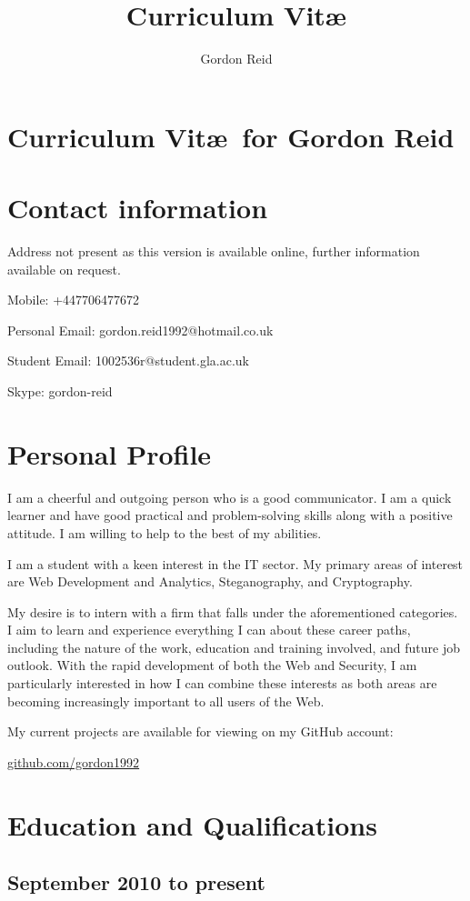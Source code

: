 \documentclass[11pt,a4paper]{article}
\title{Curriculum Vit\ae}
\author{Gordon Reid}
\begin{document}
\section*{Curriculum Vit\ae\ for Gordon Reid}
\section*{Contact information}
Address not present as this version is available online, further information 
available on request.

Mobile: +447706477672

Personal Email: gordon.reid1992@hotmail.co.uk

Student Email: 1002536r@student.gla.ac.uk

Skype: gordon-reid

\section*{Personal Profile}

I am a cheerful and outgoing person who is a good communicator. I am a quick 
learner and have good practical and problem-solving skills along with a 
positive attitude. I am willing to help to the best of my abilities.

I am a student with a keen interest in the IT sector. My primary areas of
interest are Web Development and Analytics, Steganography, and Cryptography.

My desire is to intern with a firm that falls under the aforementioned
categories. I aim to learn and experience everything I can about these
career paths, including the nature of the work, education and training
involved, and future job outlook. With the rapid development of both the Web
and Security, I am particularly interested in how I can combine these
interests as both areas are becoming increasingly important to all users of
the Web.

My current projects are available for viewing on my GitHub account:

\url{github.com/gordon1992}

\section*{Education and Qualifications}

\subsection*{September 2010 to present}
\end{document}
